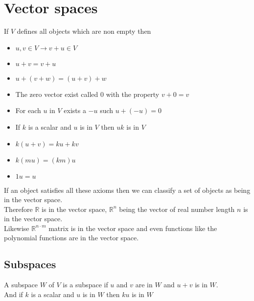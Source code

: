 \documentclass[12pt, a4paper]{article}
\begin{document}
	\section{Vector spaces}
		If $V$ defines all objects which are non empty then
		\begin{itemize}
			\item $u,v\in V\rightarrow v+u\in V$
			\item $u+v=v+u$
			\item $u+(v+w)=(u+v)+w$
			\item The zero vector exist called $0$ with the property $v+0=v$
			\item For each $u$ in $V$ exists a $-u$ such $u+(-u)=0$
			\item If $k$ is a scalar and $u$ is in $V$ then $uk$ is in $V$
			\item  $k(u+v)=ku+kv$
			\item $k(mu)=(km)u$
			\item $1u=u$
		\end{itemize}
		If an object satisfies all these axioms then we can classify a set of objects as being in the  vector space.\\
		Therefore $\mathbb{R}$ is in the vector space, $\mathbb{R}^n$ being the vector of real number length $n$ is in the vector space.\\
		Likewise $\mathbb{R}^{n\cdot m}$ matrix is in the vector space and even functions like the polynomial functions are in the vector space.\\
		\subsection{Subspaces}
			A subspace $W$ of $V$ is a subspace if $u$ and $v$ are in $W$ and $u+v$ is in $W$.\\
			And if $k$ is a scalar and $u$ is in $W$ then $ku$ is in $W$\\ 
			
			
			
			
			
				
\end{document}
